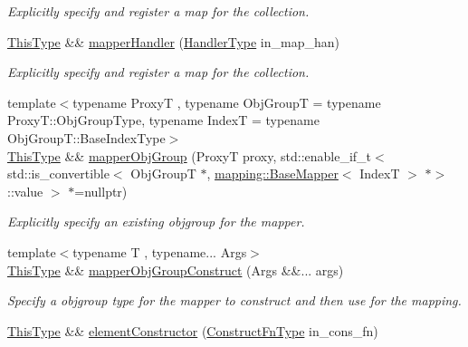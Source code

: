 \begin{DoxyCompactItemize}
\begin{DoxyCompactList}\small\item\em Explicitly specify and register a map for the collection. \end{DoxyCompactList}\item 
\hyperlink{structvt_1_1vrt_1_1collection_1_1param_1_1_construct_params_a13d4910c0f6825c7b0ddfebce5288bea}{This\+Type} \&\& \hyperlink{structvt_1_1vrt_1_1collection_1_1param_1_1_construct_params_a6e8498d29e4daaade3e4cb4b6dfa05de}{mapper\+Handler} (\hyperlink{namespacevt_af64846b57dfcaf104da3ef6967917573}{Handler\+Type} in\+\_\+map\+\_\+han)
\begin{DoxyCompactList}\small\item\em Explicitly specify and register a map for the collection. \end{DoxyCompactList}\item 
{\footnotesize template$<$typename ProxyT , typename Obj\+GroupT  = typename Proxy\+T\+::\+Obj\+Group\+Type, typename IndexT  = typename Obj\+Group\+T\+::\+Base\+Index\+Type$>$ }\\\hyperlink{structvt_1_1vrt_1_1collection_1_1param_1_1_construct_params_a13d4910c0f6825c7b0ddfebce5288bea}{This\+Type} \&\& \hyperlink{structvt_1_1vrt_1_1collection_1_1param_1_1_construct_params_a041973f0795907cc88246a1409b30978}{mapper\+Obj\+Group} (ProxyT proxy, std\+::enable\+\_\+if\+\_\+t$<$ std\+::is\+\_\+convertible$<$ Obj\+GroupT $\ast$, \hyperlink{structvt_1_1mapping_1_1_base_mapper}{mapping\+::\+Base\+Mapper}$<$ IndexT $>$ $\ast$$>$\+::value $>$ $\ast$=nullptr)
\begin{DoxyCompactList}\small\item\em Explicitly specify an existing objgroup for the mapper. \end{DoxyCompactList}\item 
{\footnotesize template$<$typename T , typename... Args$>$ }\\\hyperlink{structvt_1_1vrt_1_1collection_1_1param_1_1_construct_params_a13d4910c0f6825c7b0ddfebce5288bea}{This\+Type} \&\& \hyperlink{structvt_1_1vrt_1_1collection_1_1param_1_1_construct_params_aee38f6542fd11f8b10f1eab73c590807}{mapper\+Obj\+Group\+Construct} (Args \&\&... args)
\begin{DoxyCompactList}\small\item\em Specify a objgroup type for the mapper to construct and then use for the mapping. \end{DoxyCompactList}\item 
\hyperlink{structvt_1_1vrt_1_1collection_1_1param_1_1_construct_params_a13d4910c0f6825c7b0ddfebce5288bea}{This\+Type} \&\& \hyperlink{structvt_1_1vrt_1_1collection_1_1param_1_1_construct_params_a1a9710ed590f69867feccae0f432b724}{element\+Constructor} (\hyperlink{structvt_1_1vrt_1_1collection_1_1param_1_1_construct_params_a7ad7bdf4220701e54b485f45e08b1736}{Construct\+Fn\+Type} in\+\_\+cons\+\_\+fn)
$$
\end{DoxyCompactItemize}
